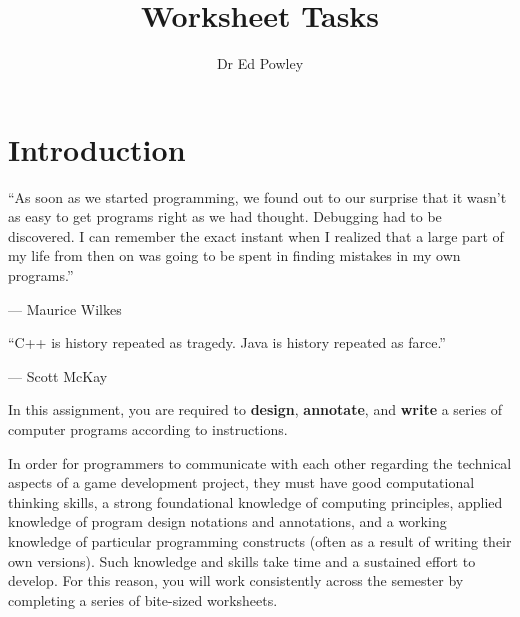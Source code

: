 \documentclass{../fal_assignment}
\title{Worksheet Tasks}
\author{Dr Ed Powley}
\begin{document}
\maketitle

\section*{Introduction}

\begin{marginquote}
``As soon as we started programming, we found out to our surprise that it wasn't as easy to get programs right as we had thought. Debugging had to be discovered. I can remember the exact instant when I realized that a large part of my life from then on was going to be spent in finding mistakes in my own programs.''
\par --- Maurice Wilkes
\marginquoterule
\par ``C++ is history repeated as tragedy. Java is history repeated as farce.''
\par --- Scott McKay
\end{marginquote}

In this assignment, you are required to \textbf{design}, \textbf{annotate}, and \textbf{write} a series of computer programs according to instructions.

In order for programmers to communicate with each other regarding the technical aspects of a game development project, they must have good computational thinking skills, a strong foundational knowledge of computing principles, applied knowledge of program design notations and annotations, and a working knowledge of particular programming constructs (often as a result of writing their own versions). Such knowledge and skills take time and a sustained effort to develop. For this reason, you will work consistently across the semester by completing a series of bite-sized worksheets.
\end{document}
